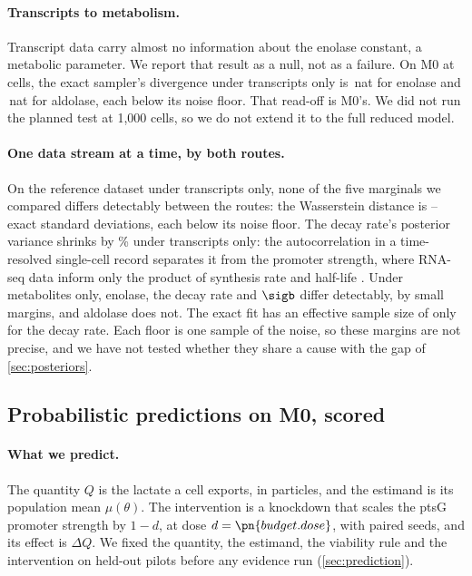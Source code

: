 \paragraph{Transcripts to metabolism.} Transcript data carry almost no information about the enolase constant, a
metabolic parameter. We report that result as a null, not as a failure. On M0 at  cells, the exact sampler's divergence under
transcripts only is \,nat for enolase and \,nat for
aldolase, each below its noise floor. That read-off is M0's. We did not run the
planned test at 1,000 cells, so we do not extend it to the full reduced model.

\paragraph{One data stream at a time, by both routes.} On the reference dataset under transcripts only,
none of the five marginals we compared differs detectably between the routes: the
Wasserstein distance is -- exact standard deviations, each
below its noise floor. The decay rate's posterior variance shrinks by \% under transcripts only:
the autocorrelation in a time-resolved single-cell record separates it from the promoter
strength, where RNA-seq data inform only the product of synthesis rate and half-life \cite{karr2015summary}.
Under metabolites only, enolase, the decay rate and $\sigb$
differ detectably, by small margins, and aldolase does not. The exact fit has an
effective sample size of only  for the decay rate. Each floor is one sample of the
noise, so these margins are not precise, and we have not tested whether they share a
cause with the gap of \cref{sec:posteriors}.

\subsection{Probabilistic predictions on M0, scored}
\label{sec:predm0}

\paragraph{What we predict.} The quantity $Q$ is the lactate a cell exports, in particles, and the estimand is its population
mean $\mu(\theta)$. The intervention is a knockdown that scales the ptsG promoter strength
by $1 - d$, at dose $d = \pn{budget.dose}$, with paired seeds, and its effect is $\Delta Q$. We fixed the quantity, the estimand, the viability rule and the
intervention on held-out pilots before any evidence run (\cref{sec:prediction}).

